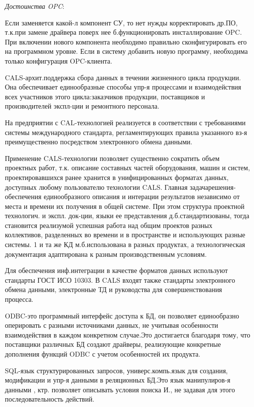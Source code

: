 \documentclass[unicode, 12pt, a4paper, oneside]{article}
\begin{document}
\textit{Достоинства OPC}:

Если заменяется какой-л компонент СУ, то нет нужды корректировать др.ПО, т.к.при замене драйвера поверх нее б.функционировать инсталлирование OPC. При включении нового компонента необходимо правильно сконфигурировать его на программном уровне. Если в систему добавить новую программу, необходима только конфигурация OPC-клиента.

CALS-архит.поддержка сбора данных в течении жизненного цикла продукции. Она обеспечивает единообразные способы упр-я процессами и взаимодействия всех участников этого цикла:заказчиков продукции, поставщиков и производителей экспл-ции и ремонтного персонала.

На предприятии с CAL-технологией реализуется в соответствии с требованиями системы международного стандарта, регламентирующих правила указанного вз-я преимущественно посредством электронного обмена данными.

Применение CALS-технологии позволяет существенно сократить объем проектных работ, т.к. описание составных частей оборудования, машин и систем, проектировавшихся ранее хранится в унифицированных форматах данных, доступных любому пользователю технологии CALS. Главная задачарешения-обеспечения единообразного описания и интерации результатов независимо от места и времени их получения в общей системе. При этом структура проектной технологич. и экспл. док-ции, языки ее представления д.б.стандартизованы, тогда становится реализумой успешная работа над общим проектов разных коллективов, разделенных во времени и в пространстве и использующих разные системы. 1 и та же КД м.б.использована в разных продуктах, а технологическая документация адаптирована к разным производственным условиям.

Для обеспечения инф.интеграции в качестве форматов данных используют стандарты ГОСТ ИСО 10303. В CALS входят также стандарты электронного обмена данными, электронные ТД и руководства для совершенствования процесса.

ODBC-это программный интерфейс доступа к БД, он позволяет единообразно оперировать с разными источниками данных, не учитывая особенности взаимодействия в каждом конкретном случае.Это достигается благодаря тому, что поставщики различных БД создают драйверы, реализующие конкретные дополнения функций ODBC с учетом особенностей их продукта.

SQL-язык структурированных запросов, универс.компь.язык для создания, модификации и упр-я данными в реляционных БД.Это язык манипулиров-я данными , ктр. позволяет описывать условия поиска И., не задавая для этого последовательность действий.
\end{document}

